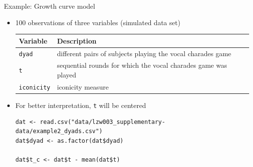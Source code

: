 \documentclass[aspectratio=169]{beamer}
\begin{document}
\begin{frame}[fragile]{Example: Growth curve model}
  \begin{itemize}
    \item 100 observations of three variables (simulated data set)\\[2ex]
  \begin{tabular}{lp{10cm}}
      Variable & Description \\
    \hline
      \texttt{dyad} & different pairs of subjects playing the vocal charades game\\
      \texttt{t} & sequential rounds for which the vocal charades game was played \\
      \texttt{iconicity} & iconicity measure \\
     \hline
  \end{tabular}

  \vspace{.5cm}
\item For better interpretation, \texttt{t} will be centered
  \begin{lstlisting}
dat <- read.csv("data/lzw003_supplementary-data/example2_dyads.csv")
dat$dyad <- as.factor(dat$dyad)

dat$t_c <- dat$t - mean(dat$t)
  \end{lstlisting}
  \end{itemize}
\end{frame}
\end{document}
